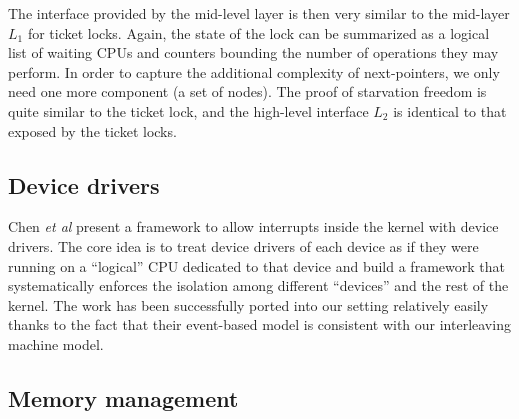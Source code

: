 {The interface provided by the mid-level layer is then very similar to
the mid-layer $L_1$ for ticket locks. Again, the state of the lock
can be summarized as a logical list of waiting CPUs and counters
bounding the number of operations they may perform. In order to capture the
additional complexity of next-pointers, we only need one more
component (a set of nodes). The proof of starvation freedom is quite
similar to the ticket lock, and the high-level interface $L_2$ is
identical to that exposed by the ticket locks.


\ignore{
\begin{figure}
 = C, multicols=2] {source_code/mcs_lock.c}
\caption{MCS Lock Implementation}
\label{fig:exp:mcs_lock}
\end{figure}
}

\subsection{Device drivers}
\label{sec:con:device}
Chen {\it et al} \cite{chen16} present a framework to allow interrupts
inside the kernel
with device drivers. The core idea is to treat device drivers of
each device as if they were running on a ``logical'' CPU dedicated to that device
and build a framework that systematically enforces the isolation among different
``devices'' and the rest of the kernel. The work has been successfully ported
into our setting relatively easily thanks to the fact that their event-based
 model is consistent with our interleaving machine model.


\subsection{Memory management}
\label{sec:con:mem}


}
